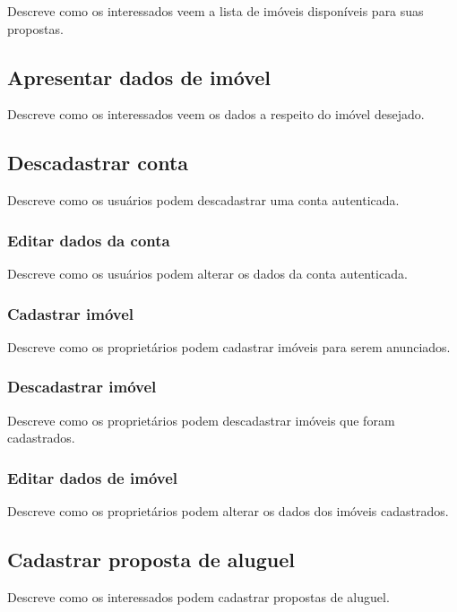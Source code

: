Descreve como os interessados  veem a lista de imóveis disponíveis para suas propostas.

\subsection*{Apresentar dados de imóvel} 

Descreve como os interessados veem os dados a respeito do imóvel desejado.

\subsection*{Descadastrar conta} 

Descreve como os usuários podem descadastrar uma conta autenticada.

\subsubsection*{Editar dados da conta}

Descreve como os usuários podem alterar os dados da conta autenticada.

\subsubsection*{Cadastrar imóvel}

Descreve como os proprietários podem cadastrar imóveis para serem anunciados.

\subsubsection*{Descadastrar imóvel}

Descreve como os proprietários podem descadastrar imóveis que foram cadastrados.

\subsubsection*{Editar dados de imóvel}

Descreve como os proprietários podem alterar os dados dos imóveis cadastrados.

\subsection*{Cadastrar proposta de aluguel}

Descreve como os interessados podem cadastrar propostas de aluguel.

